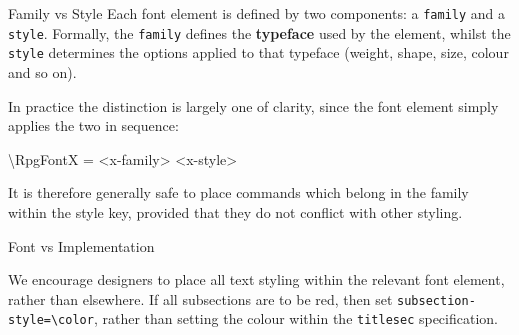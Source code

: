 		\begin{RpgSidebar}{Family vs Style}
			Each font element is defined by two components: a \texttt{family} and a \texttt{style}. Formally, the \texttt{family} defines the \textbf{typeface} used by the element, whilst the \texttt{style} determines the options applied to that typeface (weight, shape, size, colour and so on).

			In practice the distinction is largely one of clarity, since the font element simply applies the two in sequence:
			\begin{Code}
				\textbackslash{}RpgFontX = <x-family> <x-style>
			\end{Code}
			It is therefore generally safe to place commands which belong in the family within the style key, provided that they do not conflict with other styling.

			\vspace{1em}
			{\RpgFontSidebarTitle{} \noindent{} Font vs Implementation}
			\vspace{1em}

			We encourage designers to place all text styling within the relevant font element, rather than elsewhere. If all subsections are to be red, then set \texttt{subsection-style=\textbackslash{}color}, rather than setting the colour within the \texttt{titlesec} specification.

		\end{RpgSidebar}



